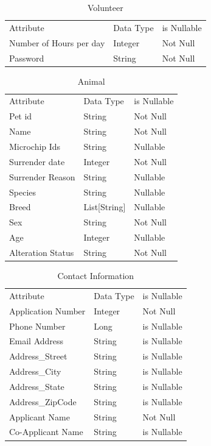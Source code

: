 \documentclass[a4paper]{article}
\begin{document}
\begin{table}[H]
	\centering
	\begin{tabular}{|l|l|l|}
		Attribute     & Data Type & is Nullable \\
		Number of Hours per day     & Integer    & Not Null \\
		Password      & String    & Not Null \\
	\end{tabular}
	\caption{Volunteer}
\end{table}



\begin{table}[H]
	\centering
	\begin{tabular}{|l|l|l|}
		Attribute     & Data Type & is Nullable \\
		Pet id     & String    & Not Null \\
		Name      & String    & Not Null \\
		Microchip Ids      & String    & Nullable \\
		Surrender date      & Integer    & Not Null \\
		Surrender Reason      & String    & Nullable \\
		Species      & String    & Nullable \\
		Breed      & List[String]    & Nullable \\
		Sex      & String   & Not Null \\
		Age      & Integer   & Nullable \\
		Alteration Status      & String   & Not Null \\
	\end{tabular}
	\caption{Animal}
\end{table}

\begin{table}[H]
	\centering
	\begin{tabular}{|l|l|l|}
		Attribute     & Data Type & is Nullable \\
		Application Number     & Integer & Not Null \\
		Phone Number     & Long & is Nullable \\
		Email Address     & String & is Nullable \\
		Address\_Street    & String & is Nullable \\
		Address\_City   & String & is Nullable \\
		Address\_State   & String & is Nullable \\
		Address\_ZipCode  & String & is Nullable \\
		Applicant Name  & String & Not Null \\
		Co-Applicant Name  & String & is Nullable \\
	\end{tabular}
	\caption{Contact Information}
\end{table}
\end{document}
